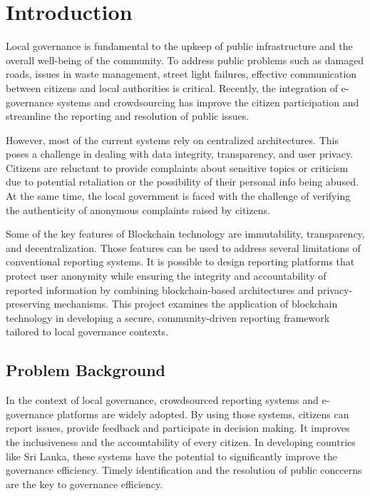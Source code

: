 \chapter{Introduction}

Local governance is fundamental to the upkeep of public infrastructure and the overall well-being of the community. To address public problems such as damaged roads, issues in waste management, street light failures, effective communication between citizens and local authorities is critical. Recently, the integration of e-governance systems and crowdsourcing has improve the citizen participation and streamline the reporting and resolution of public issues. 

However, most of the current systems rely on centralized architectures. This poses a challenge in dealing with data integrity, transparency, and user privacy. Citizens are reluctant to provide complaints about sensitive topics or criticism due to potential retaliation or the possibility of their personal info being abused. At the same time, the local government is faced with the challenge of verifying the authenticity of anonymous complaints raised by citizens.

Some of the key features of Blockchain technology are immutability, transparency, and decentralization. Those features can be used to address several limitations of conventional reporting systems. It is possible to design reporting platforms that protect user anonymity while ensuring the integrity and accountability of reported information by combining blockchain-based architectures and privacy-preserving mechanisms. This project examines the application of blockchain technology in developing a secure, community-driven reporting framework tailored to local governance contexts.


\section{Problem Background}

In the context of local governance, crowdsourced reporting systems and e-governance platforms are widely adopted. By using those systems, citizens can report issues, provide feedback and participate in decision making. It improves the inclusiveness and the accountability of every citizen. In developing countries like Sri Lanka, these systems have the potential to significantly improve the governance efficiency. Timely identification and the resolution of public conccerns are the key to governance efficiency. 

